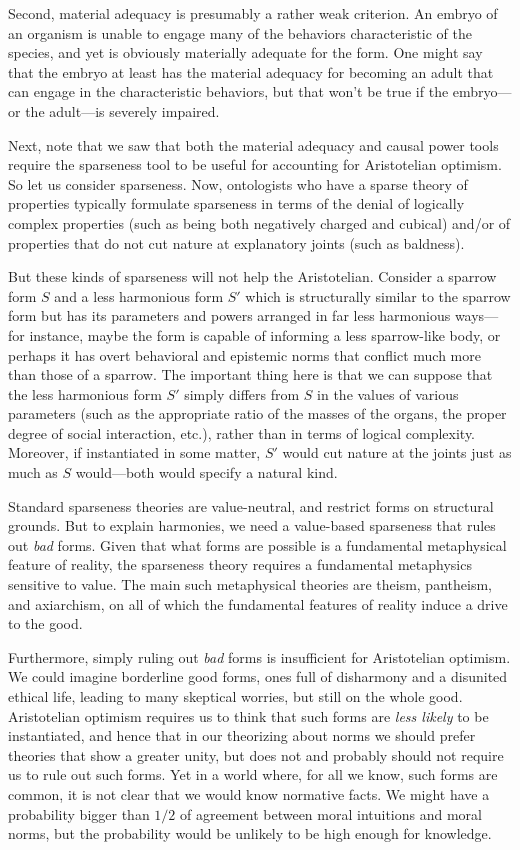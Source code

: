 Second, material adequacy is presumably a rather weak criterion. An embryo of an organism is unable to engage many
of the behaviors characteristic of the species, and yet is obviously materially adequate for the form. One might
say that the embryo at least has the material adequacy for becoming an adult that can engage in the characteristic
behaviors, but that won't be true if the embryo---or the adult---is severely impaired. 

Next, note that we saw that both the material adequacy and causal power tools require the sparseness tool to be useful
for accounting for Aristotelian optimism. So let us consider sparseness. Now, ontologists who have a sparse theory of properties typically formulate
sparseness in terms of the denial of logically complex properties (such as being both negatively charged and cubical)
and/or of properties that do not cut nature at explanatory joints (such as baldness). 

But these kinds of sparseness will not help the Aristotelian. Consider a sparrow form $S$ and a less harmonious form 
$S'$ which is structurally similar to the sparrow form but has its parameters and powers arranged in far less harmonious 
ways---for instance, maybe the form is capable of informing a less sparrow-like body, or perhaps it has overt 
behavioral and epistemic norms that conflict much more than those of a sparrow. The important thing here is that 
we can suppose that the less harmonious form $S'$ simply differs from $S$ in the values of various parameters
(such as the appropriate ratio of the masses of the organs, the proper degree of social interaction, etc.), rather 
than in terms of logical complexity. Moreover, if instantiated in some matter, $S'$ would cut nature at the joints 
just as much as $S$ would---both would specify a natural kind.

Standard sparseness theories are value-neutral, and restrict forms on structural grounds. But to explain harmonies,
we need a value-based sparseness that rules out \textit{bad} forms. Given that what forms are possible is a fundamental
metaphysical feature of reality, the sparseness theory requires a fundamental metaphysics sensitive to value. The main
such metaphysical theories are theism, pantheism, and axiarchism, on all of which the fundamental features of reality 
induce a drive to the good.

Furthermore, simply ruling out \textit{bad} forms is insufficient for Aristotelian optimism. We could imagine 
borderline good forms, ones full of disharmony and a disunited ethical life, leading to many skeptical worries, but 
still on the whole good. Aristotelian optimism requires us to think that such forms are \textit{less likely} to be
instantiated, and hence that in our theorizing about norms we should prefer theories that show a greater unity, 
but does not and probably should not require us to rule out such forms. Yet in a world where, for all we know, such 
forms are common, it is not clear that we would know normative facts. We might have a probability bigger than $1/2$
of agreement between moral intuitions and moral norms, but the probability would be unlikely to be high enough for
knowledge.
 
